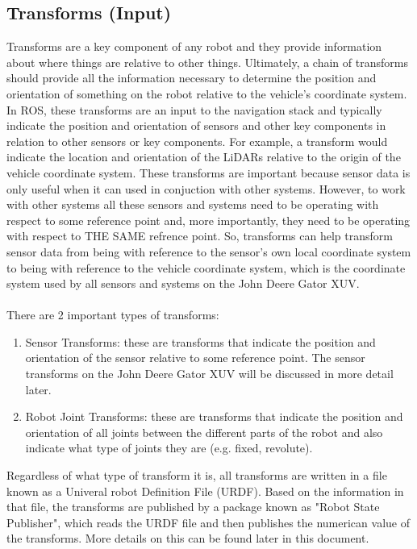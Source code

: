 \subsection{Transforms (Input)}

Transforms are a key component of any robot and they provide information about where things are relative to other things. Ultimately, a chain of transforms should provide all the information necessary to determine the position and orientation of something on the robot relative to the vehicle's coordinate system. In ROS, these transforms are an input to the navigation stack and typically indicate the position and orientation of sensors and other key components in relation to other sensors or key components. For example, a transform would indicate the location and orientation of the LiDARs relative to the origin of the vehicle coordinate system. These transforms are important because sensor data is only useful when it can used in conjuction with other systems. However, to work with other systems all these sensors and systems need to be operating with respect to some reference point and, more importantly, they need to be operating with respect to THE SAME refrence point. So, transforms can help transform sensor data from being with reference to the sensor's own local coordinate system to being with reference to the vehicle coordinate system, which is the coordinate system used by all sensors and systems on the John Deere Gator XUV.\\ \\
%
There are 2 important types of transforms:

\begin{enumerate}
\item Sensor Transforms: these are transforms that indicate the position and orientation of the sensor relative to some reference point. The sensor transforms on the John Deere Gator XUV will be discussed in more detail later.
\item Robot Joint Transforms: these are transforms that indicate the position and orientation of all joints between the different parts of the robot and also indicate what type of joints they are (e.g. fixed, revolute). 
\end{enumerate} 

\noindent Regardless of what type of transform it is, all transforms are written in a file known as a Univeral robot Definition File (URDF). Based on the information in that file, the transforms are published by a package known as "Robot State Publisher", which reads the URDF file and then publishes the numerican value of the transforms. More details on this can be found later in this document.

